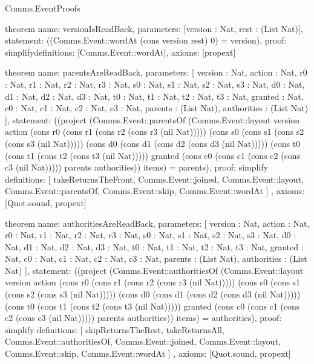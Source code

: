 \begin{lexlean}{Comms.EventProofs}
\begin{semanticmodule}
theorem{
  name: versionIsReadBack,
  parameters: [version : Nat, rest : (List Nat)],
  statement: ((Comms.Event::wordAt (cons version rest) 0) = version),
  proof: simplify{definitions: [Comms.Event::wordAt]},
  axioms: [propext]
}

theorem{
  name: parentsAreReadBack,
  parameters: [
    version : Nat,
    action : Nat,
    r0 : Nat,
    r1 : Nat,
    r2 : Nat,
    r3 : Nat,
    s0 : Nat,
    s1 : Nat,
    s2 : Nat,
    s3 : Nat,
    d0 : Nat,
    d1 : Nat,
    d2 : Nat,
    d3 : Nat,
    t0 : Nat,
    t1 : Nat,
    t2 : Nat,
    t3 : Nat,
    granted : Nat,
    c0 : Nat,
    c1 : Nat,
    c2 : Nat,
    c3 : Nat,
    parents : (List Nat),
    authorities : (List Nat)
  ],
  statement: ((project (Comms.Event::parentsOf (Comms.Event::layout version action (cons r0 (cons r1 (cons r2 (cons r3 (nil Nat))))) (cons s0 (cons s1 (cons s2 (cons s3 (nil Nat))))) (cons d0 (cons d1 (cons d2 (cons d3 (nil Nat))))) (cons t0 (cons t1 (cons t2 (cons t3 (nil Nat))))) granted (cons c0 (cons c1 (cons c2 (cons c3 (nil Nat))))) parents authorities)) items) = parents),
  proof: simplify{
    definitions: [
      takeReturnsTheFront,
      Comms.Event::joined,
      Comms.Event::layout,
      Comms.Event::parentsOf,
      Comms.Event::skip,
      Comms.Event::wordAt
    ]
  },
  axioms: [Quot.sound, propext]
}

theorem{
  name: authoritiesAreReadBack,
  parameters: [
    version : Nat,
    action : Nat,
    r0 : Nat,
    r1 : Nat,
    r2 : Nat,
    r3 : Nat,
    s0 : Nat,
    s1 : Nat,
    s2 : Nat,
    s3 : Nat,
    d0 : Nat,
    d1 : Nat,
    d2 : Nat,
    d3 : Nat,
    t0 : Nat,
    t1 : Nat,
    t2 : Nat,
    t3 : Nat,
    granted : Nat,
    c0 : Nat,
    c1 : Nat,
    c2 : Nat,
    c3 : Nat,
    parents : (List Nat),
    authorities : (List Nat)
  ],
  statement: ((project (Comms.Event::authoritiesOf (Comms.Event::layout version action (cons r0 (cons r1 (cons r2 (cons r3 (nil Nat))))) (cons s0 (cons s1 (cons s2 (cons s3 (nil Nat))))) (cons d0 (cons d1 (cons d2 (cons d3 (nil Nat))))) (cons t0 (cons t1 (cons t2 (cons t3 (nil Nat))))) granted (cons c0 (cons c1 (cons c2 (cons c3 (nil Nat))))) parents authorities)) items) = authorities),
  proof: simplify{
    definitions: [
      skipReturnsTheRest,
      takeReturnsAll,
      Comms.Event::authoritiesOf,
      Comms.Event::joined,
      Comms.Event::layout,
      Comms.Event::skip,
      Comms.Event::wordAt
    ]
  },
  axioms: [Quot.sound, propext]
}


\end{semanticmodule}
\end{lexlean}
